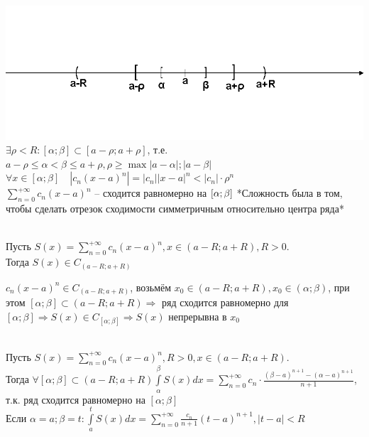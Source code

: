 \begin{Proof}~\\
	\includegraphics[width = 1\textwidth]{pictures/4_3_2.png}\\
	$\exists \rho < R: [\alpha;\beta] \subset [a-\rho;a+\rho]$, т.е. $a-\rho \leq \alpha < \beta \leq a+\rho, \rho \geq \max {|a-\alpha|;|a-\beta|}$\\
	$\forall x \in [\alpha;\beta] \quad |c_n(x-a)^n| = |c_n||x-a|^n < |c_n| \cdot \rho^n$\\
	$\sum\limits_{n=0}^{+\infty}c_n(x-a)^n$	-- сходится равномерно на $[\alpha;\beta]\\$
	*Сложность была в том, чтобы сделать отрезок сходимости симметричным относительно центра ряда*
\end{Proof}

\begin{Seq}~\\
	Пусть $S(x) = \sum\limits_{n=0}^{+\infty}c_n(x-a)^n, x \in (a-R;a+R), R > 0$.\\
	Тогда $S(x) \in C_{(a-R;a+R)}$
\end{Seq}

\begin{Proof}
	$c_n(x-a)^n \in C_{(a-R;a+R)}$, возьмём $x_0 \in (a-R;a+R), x_0 \in (\alpha;\beta)$, при этом $[\alpha;\beta] \subset (a-R;a+R) \Rightarrow$ ряд сходится равномерно для $[\alpha;\beta] \Rightarrow S(x) \in C_{[\alpha;\beta]} \Rightarrow S(x)$ непрерывна в $x_0$
\end{Proof}

\begin{Seq}~\\
	Пусть $S(x)  = \sum\limits_{n=0}^{+\infty}c_n(x-a)^n, R > 0, x \in (a-R;a+R)$.\\
	Тогда $\forall [\alpha;\beta] \subset (a-R;a+R) \int\limits_{\alpha}^{\beta}S(x)dx = \sum\limits_{n=0}^{+\infty}c_n \cdot \frac{(\beta - a)^{n+1} - (\alpha - a)^{n+1}}{n+1}$, т.к. ряд сходится равномерно на $[\alpha;\beta]$\\
	Если $\alpha = a; \beta = t: \int\limits_{a}^{t}S(x)dx = \sum\limits_{n=0}^{+\infty}\frac{c_n}{n+1}(t-a)^{n+1}, |t-a| < R$ 
\end{Seq}

